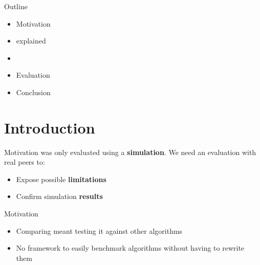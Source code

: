 



\begin{frame}[plain]
  
\titlepage

\end{frame}


\subtitle[Outline]{Outline}

\begin{frame}{Outline}
    \begin{itemize}
        \item Motivation
        \item \epto{} explained
        \item \sys
        \item Evaluation
        \item Conclusion
    \end{itemize}
\end{frame}

\section{Introduction}
\subtitle[Introduction]{Introduction}

\begin{frame}{Motivation}
    \epto{} was only evaluated using a \textbf{simulation}. We need an evaluation with real peers to:
    \begin{itemize}
    	\item Expose possible \textbf{limitations}
    	\item Confirm simulation \textbf{results}
    \end{itemize} 
\end{frame}

\begin{frame}{Motivation}
  \begin{itemize}
  \item Comparing \epto{} meant testing it against other algorithms
  \item No framework to easily benchmark algorithms without having to rewrite them
  \end{itemize}

\end{frame}

